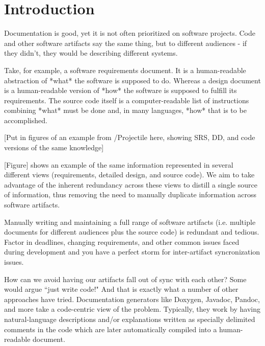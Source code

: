 \chapter{Introduction}


Documentation is good\citep{??}, yet it is not often prioritized on software
projects. Code and other software artifacts say the same thing, but to different
audiences - if they didn't, they would be describing different systems.

Take, for example, a software requirements document. It is a human-readable
abstraction of *what* the software is supposed to do. Whereas a design document
is a human-readable version of *how* the software is supposed to fulfill its
requirements. The source code itself is a computer-readable list of instructions
combining *what* must be done and, in many languages, *how* that is to be
accomplished.

[Put in figures of an example from \gb{}/Projectile here, showing SRS, DD, and
code versions of the same knowledge]

[Figure] shows an example of the same information represented in several
different views (requirements, detailed design, and source code). We aim to
take advantage of the inherent redundancy across these views to distill a single
source of information, thus removing the need to manually duplicate information
across software artifacts.

Manually writing and maintaining a full range of software artifacts (i.e.
multiple documents for different audiences plus the source code) is
redundant and tedious. Factor in deadlines, changing requirements, and other
common issues faced during development and you have a perfect storm for
inter-artifact syncronization issues.

How can we avoid having our artifacts fall out of sync with each other?
Some would argue ``just write code!" And that is exactly what a number of other
approaches have tried. Documentation generators like Doxygen, Javadoc, Pandoc,
and more take a code-centric view of the problem. Typically, they work by having
natural-language descriptions and/or explanations written as specially delimited
comments in the code which are later automatically compiled into a
human-readable document.

